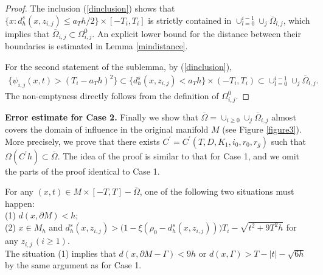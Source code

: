 \documentclass[11pt,letterpaper]{amsart}
\numberwithin{equation}{section}
\theoremstyle{definition}
\theoremstyle{plain}
\theoremstyle{definition}
\theoremstyle{plain}
\theoremstyle{definition}
\theoremstyle{plain}
\begin{document}
\begin{proof}
The inclusion (\ref{dinclusion}) shows that $\{x: d_h^s(x,z_{i,j}) \leqslant a_T h/2\}\times [-T_i,T_i]$ is strictly contained in $\cup_{l=0}^{i-1}\cup_j\overline{\Omega}_{l,j}$, which implies that $\overline{\Omega}_{i,j}\subset \Omega_{i,j}^0$. An explicit lower bound for the distance between their boundaries is estimated in Lemma \ref{mindistance}.

For the second statement of the sublemma, by (\ref{dinclusion}),
\begin{eqnarray*}
\{\psi_{i,j}(x,t)>(T_i-a_T h)^2\}\subset \{d_h^s(x,z_{i,j}) < a_T h\}\times (-T_i,T_i) \subset \cup_{l=0}^{i-1}\cup_j\overline{\Omega}_{l,j}.
\end{eqnarray*}
The non-emptyness directly follows from the definition of $\Omega^{0}_{i,j}$.
\end{proof}

\smallskip
\noindent\textbf{Error estimate for Case 2.} Finally we show that $\overline{\Omega}=\cup_{i\geqslant 0}\cup_{j} \overline{\Omega}_{i,j}$ almost covers the domain of influence in the original manifold $M$ (see Figure \ref{figure3}). More precisely, we prove that there exists $C^{\prime}=C^{\prime}(T,D,K_1,i_0,r_0,r_g)$ such that $\Omega(C^{\prime}h)\subset \overline{\Omega}$. The idea of the proof is similar to that for Case 1, and we omit the parts of the proof identical to Case 1.

For any $(x,t)\in M\times [-T,T]-\overline{\Omega}$, one of the following two situations must happen:\\
(1) $d(x, \partial M)< h$; \\
(2) $x\in M_h$ and $d_h^s(x,z_{i,j})> \big(1-\xi(\rho_0-d_h^s(x,z_{i,j}))\big)T_i-\sqrt{t^2+9T^2 h}$ for any $z_{i,j}\,(i\geqslant 1)$. \\
The situation (1) implies that $d(x,\partial M-\Gamma)<9h$ or $d(x,\Gamma)>T-|t|-\sqrt{6h}$ by the same argument as for Case 1.
\end{document}
